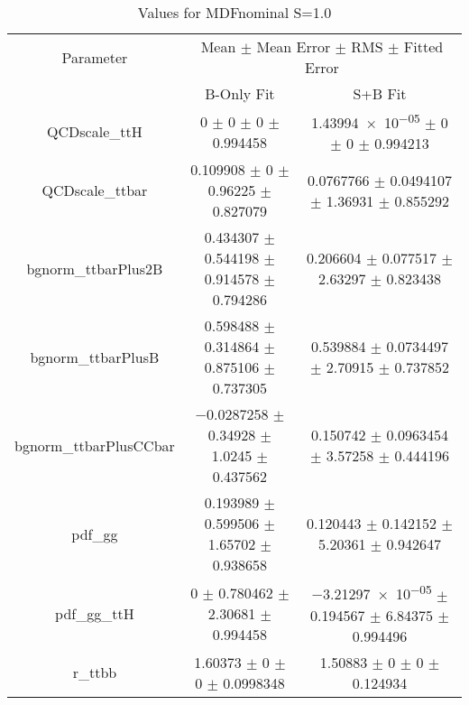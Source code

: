 \begin{table}
\centering
\caption{Values for MDFnominal S=1.0}
\begin{tabular}{ccc}
\toprule
Parameter & \multicolumn{2}{c}{Mean $\pm$ Mean Error $\pm$ RMS $\pm$ Fitted Error}\\
 & B-Only Fit & S+B Fit\\
\midrule
QCDscale\_ttH & \num{0} $\pm$ \num{0} $\pm$ \num{0} $\pm$ \num{0.994458} & \num{1.43994e-05} $\pm$ \num{0} $\pm$ \num{0} $\pm$ \num{0.994213}\\
QCDscale\_ttbar & \num{0.109908} $\pm$ \num{0} $\pm$ \num{0.96225} $\pm$ \num{0.827079} & \num{0.0767766} $\pm$ \num{0.0494107} $\pm$ \num{1.36931} $\pm$ \num{0.855292}\\
bgnorm\_ttbarPlus2B & \num{0.434307} $\pm$ \num{0.544198} $\pm$ \num{0.914578} $\pm$ \num{0.794286} & \num{0.206604} $\pm$ \num{0.077517} $\pm$ \num{2.63297} $\pm$ \num{0.823438}\\
bgnorm\_ttbarPlusB & \num{0.598488} $\pm$ \num{0.314864} $\pm$ \num{0.875106} $\pm$ \num{0.737305} & \num{0.539884} $\pm$ \num{0.0734497} $\pm$ \num{2.70915} $\pm$ \num{0.737852}\\
bgnorm\_ttbarPlusCCbar & \num{-0.0287258} $\pm$ \num{0.34928} $\pm$ \num{1.0245} $\pm$ \num{0.437562} & \num{0.150742} $\pm$ \num{0.0963454} $\pm$ \num{3.57258} $\pm$ \num{0.444196}\\
pdf\_gg & \num{0.193989} $\pm$ \num{0.599506} $\pm$ \num{1.65702} $\pm$ \num{0.938658} & \num{0.120443} $\pm$ \num{0.142152} $\pm$ \num{5.20361} $\pm$ \num{0.942647}\\
pdf\_gg\_ttH & \num{0} $\pm$ \num{0.780462} $\pm$ \num{2.30681} $\pm$ \num{0.994458} & \num{-3.21297e-05} $\pm$ \num{0.194567} $\pm$ \num{6.84375} $\pm$ \num{0.994496}\\
r\_ttbb & \num{1.60373} $\pm$ \num{0} $\pm$ \num{0} $\pm$ \num{0.0998348} & \num{1.50883} $\pm$ \num{0} $\pm$ \num{0} $\pm$ \num{0.124934}\\
\bottomrule
\end{tabular}
\end{table}